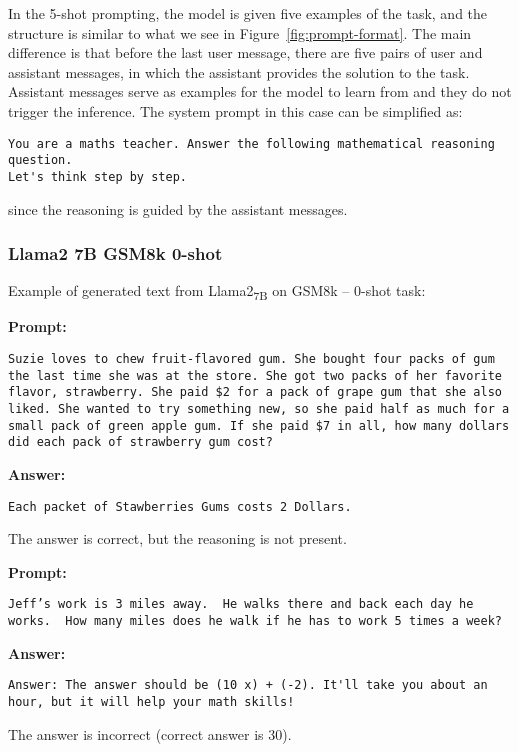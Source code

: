 In the 5-shot prompting, the model is given five examples of the task, and the structure is similar to what we see in Figure~\ref{fig:prompt-format}.
The main difference is that before the last user message, there are five pairs of user and assistant messages, in which the assistant provides the solution to the task.
Assistant messages serve as examples for the model to learn from and they do not trigger the inference.
The system prompt in this case can be simplified as:
\begin{Verbatim}[fontsize=\small,breaklines]
You are a maths teacher. Answer the following mathematical reasoning question.
Let's think step by step.
\end{Verbatim}
since the reasoning is guided by the assistant messages.

\subsubsection*{Llama2 7B GSM8k 0-shot}
\noindent Example of generated text from Llama2\textsubscript{7B} on GSM8k -- 0-shot task:
\begin{displayquote}
	\textbf{Prompt:}
	\begin{Verbatim}[fontsize=\small,breaklines]
Suzie loves to chew fruit-flavored gum. She bought four packs of gum the last time she was at the store. She got two packs of her favorite flavor, strawberry. She paid $2 for a pack of grape gum that she also liked. She wanted to try something new, so she paid half as much for a small pack of green apple gum. If she paid $7 in all, how many dollars did each pack of strawberry gum cost?
	\end{Verbatim}
	\textbf{Answer:}
	\begin{Verbatim}[fontsize=\small,breaklines]
Each packet of Stawberries Gums costs 2 Dollars.
	\end{Verbatim}
\end{displayquote}
The answer is correct, but the reasoning is not present.
\begin{displayquote}
	\textbf{Prompt:}
	\begin{Verbatim}[fontsize=\small,breaklines]
Jeff’s work is 3 miles away.  He walks there and back each day he works.  How many miles does he walk if he has to work 5 times a week?
	\end{Verbatim}
	\textbf{Answer:}
	\begin{Verbatim}[fontsize=\small,breaklines]
Answer: The answer should be (10 x) + (-2). It'll take you about an hour, but it will help your math skills!
	\end{Verbatim}
\end{displayquote}
The answer is incorrect (correct answer is 30).


